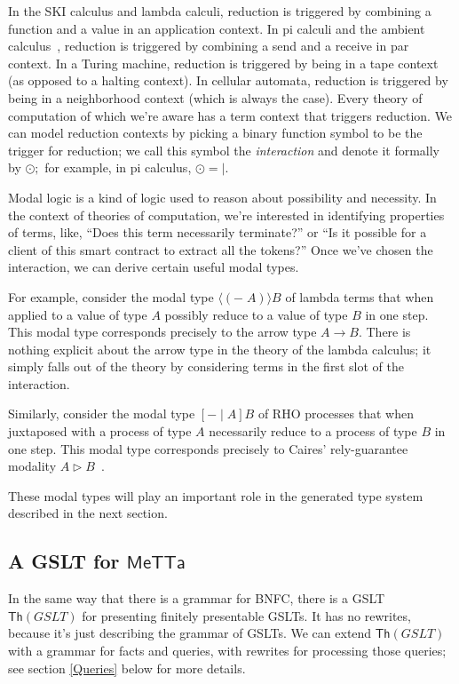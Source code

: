 \documentclass{article}
\begin{document}
In the SKI calculus and lambda calculi, reduction is triggered by combining a function and a value in an application context.  In pi calculi and the ambient calculus~\cite{CardelliGordon2000}, reduction is triggered by combining a send and a receive in par context.  In a Turing machine, reduction is triggered by being in a tape context (as opposed to a halting context).  In cellular automata, reduction is triggered by being in a neighborhood context (which is always the case).  Every theory of computation of which we're aware has a term context that triggers reduction. We can model reduction contexts by picking a binary function symbol to be the trigger for reduction; we call this symbol the {\em interaction} and denote it formally by $\odot;$ for example, in pi calculus, $\odot = |.$  

Modal logic is a kind of logic used to reason about possibility and necessity.  In the context of theories of computation, we're interested in identifying properties of terms, like, ``Does this term necessarily terminate?'' or ``Is it possible for a client of this smart contract to extract all the tokens?''  Once we've chosen the interaction, we can derive certain useful modal types.  

For example, consider the modal type $\langle (- \; A) \rangle B$ of lambda terms that when applied to a value of type $A$ possibly reduce to a value of type $B$ in one step.  This modal type corresponds precisely to the arrow type $A \to B.$  There is nothing explicit about the arrow type in the theory of the lambda calculus; it simply falls out of the theory by considering terms in the first slot of the interaction.

Similarly, consider the modal type $[ - \; |\; A ] B$ of RHO processes that when juxtaposed with a process of type $A$ necessarily reduce to a process of type $B$ in one step.  This modal type corresponds precisely to Caires' rely-guarantee modality $A \triangleright B$~\cite{Caires2007}.

These modal types will play an important role in the generated type system described in the next section.

\subsection{A GSLT for $\mathsf{MeTTa}$}
In the same way that there is a grammar for BNFC, there is a GSLT
$\mathsf{Th}(GSLT)$ for presenting finitely presentable GSLTs.  It has
no rewrites, because it's just describing the grammar of GSLTs.  We
can extend $\mathsf{Th}(GSLT)$ with a grammar for facts and queries,
with rewrites for processing those queries; see section \ref{Queries}
below for more details.
\end{document}
